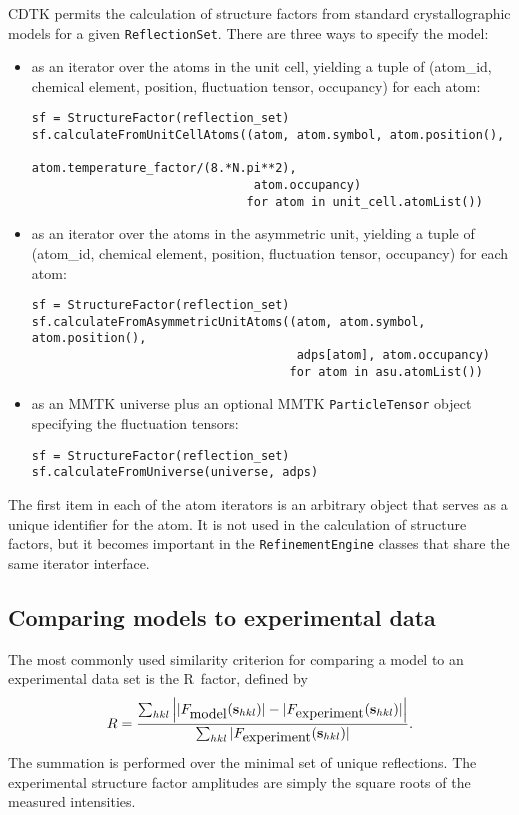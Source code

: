 \documentclass[11pt]{article}
\newcommand{\vect}[1]{{\bf #1}}
\newcommand{\vs}{\vect{s}}
\begin{document}
\begin{sloppy}
CDTK permits the calculation of structure factors from standard
crystallographic models for a given \texttt{ReflectionSet}.
There are three ways to specify the model:
\begin{itemize}
\item
as an iterator over the atoms in the unit cell, yielding a tuple
of (atom_id, chemical element, position, fluctuation tensor, occupancy)
for each atom:
{\small
\begin{verbatim}
sf = StructureFactor(reflection_set)
sf.calculateFromUnitCellAtoms((atom, atom.symbol, atom.position(),
                               atom.temperature_factor/(8.*N.pi**2),
                               atom.occupancy)
                              for atom in unit_cell.atomList())
\end{verbatim}
}
\item
as an iterator over the atoms in the asymmetric unit, yielding a tuple
of (atom_id, chemical element, position, fluctuation tensor, occupancy)
for each atom:
{\small
\begin{verbatim}
sf = StructureFactor(reflection_set)
sf.calculateFromAsymmetricUnitAtoms((atom, atom.symbol, atom.position(),
                                     adps[atom], atom.occupancy)
                                    for atom in asu.atomList())
\end{verbatim}
}
\item
as an MMTK universe plus an optional MMTK \texttt{ParticleTensor} object
specifying the fluctuation tensors:
{\small
\begin{verbatim}
sf = StructureFactor(reflection_set)
sf.calculateFromUniverse(universe, adps)
\end{verbatim}
}
\end{itemize}
The first item in each of the atom iterators is an arbitrary object
that serves as a unique identifier for the atom. It is not used
in the calculation of structure factors, but it becomes important
in the \texttt{RefinementEngine} classes that share the same
iterator interface.

\subsection{Comparing models to experimental data}

The most commonly used similarity criterion for comparing a model
to an experimental data set is the R~factor, defined by
\begin{equation}
R = \frac{\sum_{hkl}
    \left| |F_{\mbox{model}}(\vs_{hkl})|-|F_{\mbox{experiment}}(\vs_{hkl})| \right|}
    {\sum_{hkl} |F_{\mbox{experiment}}(\vs_{hkl})|}.
\end{equation}
The summation is performed over the minimal set of unique reflections.
The experimental structure factor amplitudes are simply the square roots
of the measured intensities.


\end{sloppy}
\end{document}
